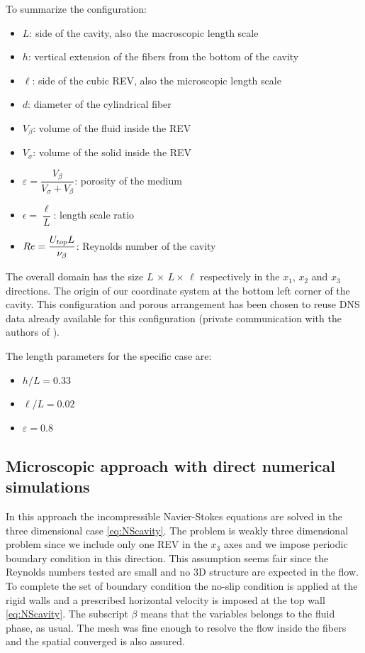 To summarize the configuration:
\begin{itemize}
	\item $L$: side of the cavity, also the macroscopic length scale
	\item $h$: vertical extension of the fibers from the bottom of the cavity 
	\item $\ell$: side of the cubic REV, also the microscopic length scale
	\item $d$: diameter of the cylindrical fiber
	\item $V_{\beta}$: volume of the fluid inside the REV
	\item $V_{\sigma}$: volume of the solid inside the REV
	\item $\varepsilon = \dfrac{V_{\beta}}{V_{\sigma} +V_{\beta}}$: porosity of the medium
	\item $\epsilon = \dfrac{\ell}{L}$: length scale ratio
	\item $Re= \dfrac{U_{top} L}{\nu_{\beta}}$: Reynolds number of the cavity
\end{itemize}

The overall domain has the size $L \, \times \, L \times \, \ell$ respectively in the $x_1$, $x_2$ and $x_3$ directions. The origin of our coordinate system at the bottom left corner of the cavity. 
This configuration and porous arrangement has been chosen to reuse DNS data already available for this configuration (private communication with the authors of \citet{zampogna2016fluid}).

The length parameters for the specific case are:
\begin{itemize}
	\item $h/L=0.33$
	\item $\ell/L=0.02$
	\item $\varepsilon = 0.8$
\end{itemize}

\subsection{Microscopic approach with direct numerical simulations}

In this approach the incompressible Navier-Stokes equations are solved in the three dimensional case \eqref{eq:NScavity}. 
The problem is weakly three dimensional problem since we include only one REV in the $x_3$ axes and we impose periodic boundary condition in this direction.
This assumption seems fair since the Reynolds numbers tested are small and no 3D structure are expected in the flow.
To complete the set of boundary condition the no-slip condition is applied at the rigid walls and a prescribed horizontal velocity is imposed at the top wall \eqref{eq:NScavity}. The subscript $\beta$ means that the variables belongs to the fluid phase, as usual. The mesh was fine enough to resolve the flow inside the fibers and the spatial converged is also assured.

